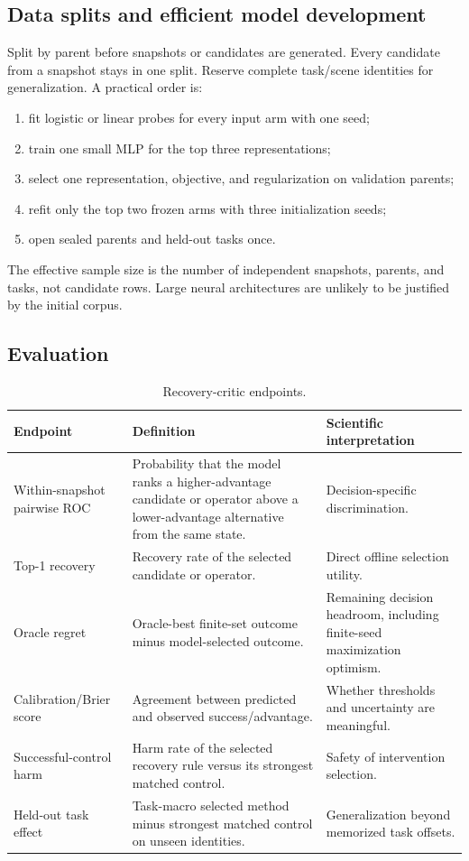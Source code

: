 \subsection{Data splits and efficient model development}

Split by parent before snapshots or candidates are generated. Every candidate from a snapshot stays in one split. Reserve complete task/scene identities for generalization. A practical order is:
\begin{enumerate}
  \item fit logistic or linear probes for every input arm with one seed;
  \item train one small MLP for the top three representations;
  \item select one representation, objective, and regularization on validation parents;
  \item refit only the top two frozen arms with three initialization seeds;
  \item open sealed parents and held-out tasks once.
\end{enumerate}
The effective sample size is the number of independent snapshots, parents, and tasks, not candidate rows. Large neural architectures are unlikely to be justified by the initial corpus.

\subsection{Evaluation}

\begin{table}[H]
\centering
\caption{Recovery-critic endpoints.}
\label{tab:phase5-endpoints}
\small
\begin{tabularx}{\textwidth}{P{0.27\textwidth}P{0.34\textwidth}Y}
\toprule
Endpoint & Definition & Scientific interpretation \\
\midrule
Within-snapshot pairwise ROC & Probability that the model ranks a higher-advantage candidate or operator above a lower-advantage alternative from the same state. & Decision-specific discrimination. \\
Top-1 recovery & Recovery rate of the selected candidate or operator. & Direct offline selection utility. \\
Oracle regret & Oracle-best finite-set outcome minus model-selected outcome. & Remaining decision headroom, including finite-seed maximization optimism. \\
Calibration/Brier score & Agreement between predicted and observed success/advantage. & Whether thresholds and uncertainty are meaningful. \\
Successful-control harm & Harm rate of the selected recovery rule versus its strongest matched control. & Safety of intervention selection. \\
Held-out task effect & Task-macro selected method minus strongest matched control on unseen identities. & Generalization beyond memorized task offsets. \\
\bottomrule
\end{tabularx}
\end{table}

